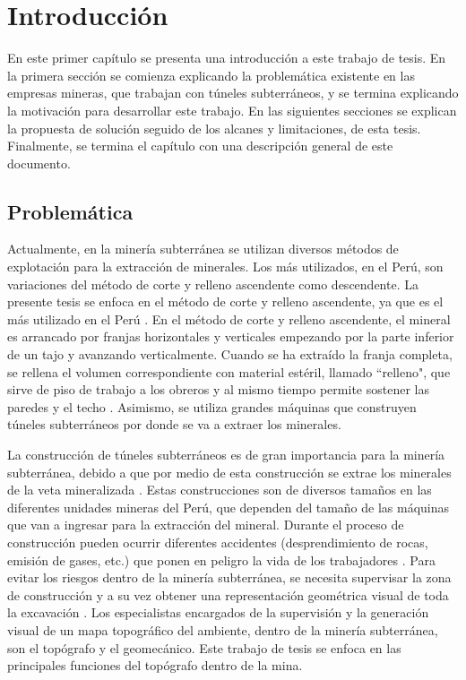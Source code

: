 \chapter{Introducción}

En este primer capítulo se presenta una introducción a este trabajo de 
tesis. En la primera sección se comienza explicando la problemática existente 
en las empresas mineras, que trabajan con túneles subterráneos, y se termina 
explicando la motivación para desarrollar este trabajo. En las siguientes secciones se explican la propuesta de solución seguido de los alcanes 
y limitaciones, de esta tesis. Finalmente, se termina el capítulo con una descripción 
general de este documento.

\section{Problemática}

Actualmente, en la minería subterránea se utilizan diversos métodos de explotación para la 
extracción de minerales. Los más utilizados, en el Perú, son variaciones del método de 
corte y relleno ascendente como descendente. La presente tesis se enfoca en el método 
de corte y relleno ascendente, ya que es el más utilizado en el Perú \cite{Cruz2012}. En 
el método de corte y relleno ascendente, el mineral es arrancado por franjas horizontales 
y verticales empezando por la parte inferior de un tajo y avanzando verticalmente. Cuando 
se ha extraído la franja completa, se rellena el volumen correspondiente con material 
estéril, llamado ``relleno", que sirve de piso de trabajo a los obreros y al mismo tiempo permite 
sostener las paredes y el techo \cite{MunozDelPino2012}. Asimismo, se utiliza grandes 
máquinas que construyen túneles subterráneos por donde se va a extraer los minerales. 

La construcción de túneles subterráneos es de gran importancia para la minería subterránea, 
debido a que por medio de esta construcción se extrae los minerales de la veta mineralizada 
\cite{EtapaTunelSubterraneo}. Estas construcciones son de diversos tamaños en las diferentes 
unidades mineras del Perú, que dependen del tamaño de las máquinas que van a ingresar para la 
extracción del mineral. Durante el proceso de construcción pueden ocurrir diferentes accidentes 
(desprendimiento de rocas, emisión de gases, etc.) que ponen en peligro la vida de los 
trabajadores \cite{GasesMinero}. Para evitar los riesgos dentro de la minería subterránea, se 
necesita supervisar la zona de construcción y a su vez obtener una representación geométrica 
visual de toda la excavación \cite{SeguridadMinera}. Los especialistas encargados de la supervisión 
y la generación visual de un mapa topográfico del ambiente, dentro de la minería subterránea, son 
el topógrafo y el geomecánico. Este trabajo de tesis se enfoca en las principales funciones del 
topógrafo dentro de la mina. 

